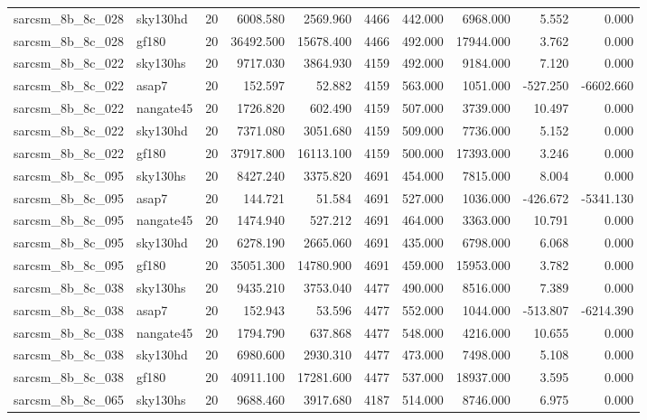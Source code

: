 \documentclass{article}
\begin{document}
\begin{longtable}{llrrrrrrrr}
sarcsm\_8b\_8c\_028 & sky130hd & 20 & 6008.580 & 2569.960 & 4466 & 442.000 & 6968.000 & 5.552 & 0.000 \\
sarcsm\_8b\_8c\_028 & gf180 & 20 & 36492.500 & 15678.400 & 4466 & 492.000 & 17944.000 & 3.762 & 0.000 \\
sarcsm\_8b\_8c\_022 & sky130hs & 20 & 9717.030 & 3864.930 & 4159 & 492.000 & 9184.000 & 7.120 & 0.000 \\
sarcsm\_8b\_8c\_022 & asap7 & 20 & 152.597 & 52.882 & 4159 & 563.000 & 1051.000 & -527.250 & -6602.660 \\
sarcsm\_8b\_8c\_022 & nangate45 & 20 & 1726.820 & 602.490 & 4159 & 507.000 & 3739.000 & 10.497 & 0.000 \\
sarcsm\_8b\_8c\_022 & sky130hd & 20 & 7371.080 & 3051.680 & 4159 & 509.000 & 7736.000 & 5.152 & 0.000 \\
sarcsm\_8b\_8c\_022 & gf180 & 20 & 37917.800 & 16113.100 & 4159 & 500.000 & 17393.000 & 3.246 & 0.000 \\
sarcsm\_8b\_8c\_095 & sky130hs & 20 & 8427.240 & 3375.820 & 4691 & 454.000 & 7815.000 & 8.004 & 0.000 \\
sarcsm\_8b\_8c\_095 & asap7 & 20 & 144.721 & 51.584 & 4691 & 527.000 & 1036.000 & -426.672 & -5341.130 \\
sarcsm\_8b\_8c\_095 & nangate45 & 20 & 1474.940 & 527.212 & 4691 & 464.000 & 3363.000 & 10.791 & 0.000 \\
sarcsm\_8b\_8c\_095 & sky130hd & 20 & 6278.190 & 2665.060 & 4691 & 435.000 & 6798.000 & 6.068 & 0.000 \\
sarcsm\_8b\_8c\_095 & gf180 & 20 & 35051.300 & 14780.900 & 4691 & 459.000 & 15953.000 & 3.782 & 0.000 \\
sarcsm\_8b\_8c\_038 & sky130hs & 20 & 9435.210 & 3753.040 & 4477 & 490.000 & 8516.000 & 7.389 & 0.000 \\
sarcsm\_8b\_8c\_038 & asap7 & 20 & 152.943 & 53.596 & 4477 & 552.000 & 1044.000 & -513.807 & -6214.390 \\
sarcsm\_8b\_8c\_038 & nangate45 & 20 & 1794.790 & 637.868 & 4477 & 548.000 & 4216.000 & 10.655 & 0.000 \\
sarcsm\_8b\_8c\_038 & sky130hd & 20 & 6980.600 & 2930.310 & 4477 & 473.000 & 7498.000 & 5.108 & 0.000 \\
sarcsm\_8b\_8c\_038 & gf180 & 20 & 40911.100 & 17281.600 & 4477 & 537.000 & 18937.000 & 3.595 & 0.000 \\
sarcsm\_8b\_8c\_065 & sky130hs & 20 & 9688.460 & 3917.680 & 4187 & 514.000 & 8746.000 & 6.975 & 0.000 \\

\end{longtable}
\end{document}
